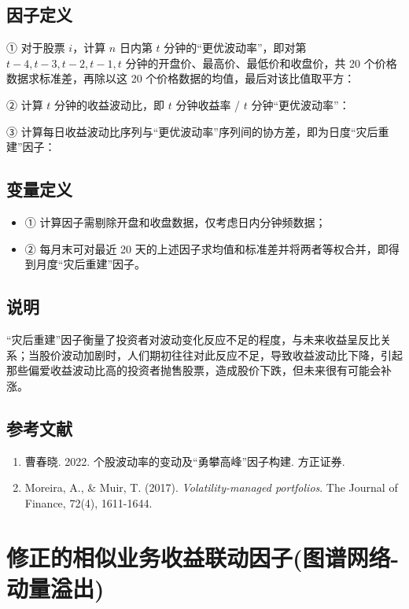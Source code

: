 \documentclass{article}
\begin{document}
\subsection{因子定义}

① 对于股票 \( i \)，计算 \( n \) 日内第 \( t \) 分钟的“更优波动率”，即对第 \( t-4, t-3, t-2, t-1, t \) 分钟的开盘价、最高价、最低价和收盘价，共 20 个价格数据求标准差，再除以这 20 个价格数据的均值，最后对该比值取平方：

② 计算 \( t \) 分钟的收益波动比，即 \( t \) 分钟收益率 / \( t \) 分钟“更优波动率”：


③ 计算每日收益波动比序列与“更优波动率”序列间的协方差，即为日度“灾后重建”因子：

\subsection{变量定义}
\begin{itemize}
    \item ① 计算因子需剔除开盘和收盘数据，仅考虑日内分钟频数据；
    \item ② 每月末可对最近 20 天的上述因子求均值和标准差并将两者等权合并，即得到月度“灾后重建”因子。
\end{itemize}

\subsection{说明}
“灾后重建”因子衡量了投资者对波动变化反应不足的程度，与未来收益呈反比关系；当股价波动加剧时，人们期初往往对此反应不足，导致收益波动比下降，引起那些偏爱收益波动比高的投资者抛售股票，造成股价下跌，但未来很有可能会补涨。

\subsection{参考文献}
\begin{enumerate}
    \item 曹春晓. 2022. 个股波动率的变动及“勇攀高峰”因子构建. 方正证券.
    \item Moreira, A., \& Muir, T. (2017). \textit{Volatility-managed portfolios}. The Journal of Finance, 72(4), 1611-1644.
\end{enumerate}

\section{修正的相似业务收益联动因子(图谱网络-动量溢出)}
\end{document}
